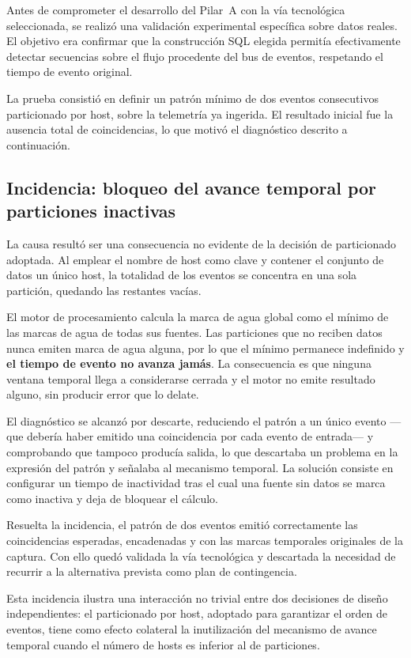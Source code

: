 Antes de comprometer el desarrollo del Pilar~A con la vía tecnológica seleccionada, se realizó
una validación experimental específica sobre datos reales. El objetivo era confirmar que la
construcción SQL elegida permitía efectivamente detectar secuencias sobre el flujo procedente
del bus de eventos, respetando el tiempo de evento original.

La prueba consistió en definir un patrón mínimo de dos eventos consecutivos particionado por
host, sobre la telemetría ya ingerida. El resultado inicial fue la ausencia total de
coincidencias, lo que motivó el diagnóstico descrito a continuación.

\subsection{Incidencia: bloqueo del avance temporal por particiones inactivas}
\label{sec:incidencia_watermark}

La causa resultó ser una consecuencia no evidente de la decisión de particionado adoptada. Al
emplear el nombre de host como clave y contener el conjunto de datos un único host, la
totalidad de los eventos se concentra en una sola partición, quedando las restantes vacías.

El motor de procesamiento calcula la marca de agua global como el mínimo de las marcas de agua
de todas sus fuentes. Las particiones que no reciben datos nunca emiten marca de agua alguna,
por lo que el mínimo permanece indefinido y \textbf{el tiempo de evento no avanza jamás}. La
consecuencia es que ninguna ventana temporal llega a considerarse cerrada y el motor no emite
resultado alguno, sin producir error que lo delate.

El diagnóstico se alcanzó por descarte, reduciendo el patrón a un único evento —que debería
haber emitido una coincidencia por cada evento de entrada— y comprobando que tampoco producía
salida, lo que descartaba un problema en la expresión del patrón y señalaba al mecanismo
temporal. La solución consiste en configurar un tiempo de inactividad tras el cual una fuente
sin datos se marca como inactiva y deja de bloquear el cálculo.

Resuelta la incidencia, el patrón de dos eventos emitió correctamente las coincidencias
esperadas, encadenadas y con las marcas temporales originales de la captura. Con ello quedó
validada la vía tecnológica y descartada la necesidad de recurrir a la alternativa prevista
como plan de contingencia.

Esta incidencia ilustra una interacción no trivial entre dos decisiones de diseño
independientes: el particionado por host, adoptado para garantizar el orden de eventos, tiene
como efecto colateral la inutilización del mecanismo de avance temporal cuando el número de
hosts es inferior al de particiones.

